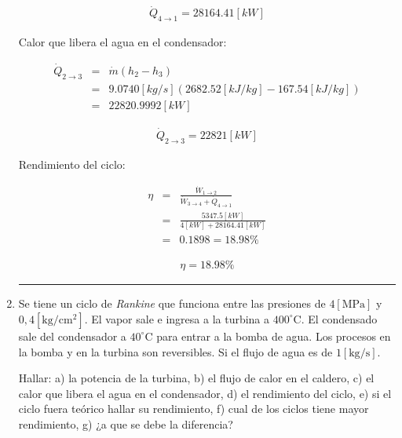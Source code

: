 \documentclass[letter,10pt]{article}
\begin{document}
\begin{enumerate}
\begin{equation*}
\boxed{
    \begin{array}{l}
        \dot{Q}_{4\rightarrow1} = 28164.41[kW]
    \end{array}
}
\end{equation*}

Calor que libera el agua en el condensador:

\begin{eqnarray*}
    \dot{Q}_{2\rightarrow3} &=& \dot{m}(h_2 - h_3) \\
                            &=& 9.0740[kg/s](2682.52[kJ/kg]-167.54[kJ/kg]) \\
                            &=& 22820.9992[kW]
\end{eqnarray*}

\begin{equation*}
\boxed{
    \begin{array}{l}
        \dot{Q}_{2\rightarrow3} = 22821[kW]
    \end{array}
}
\end{equation*}

Rendimiento del ciclo:

\begin{eqnarray*}
    \eta &=& \frac{\dot{W}_{1\rightarrow2}}
             {\dot{W}_{3\rightarrow4}+\dot{Q}_{4\rightarrow1}} \\
         &=& \frac{5347.5[kW]}{4[kW]+28164.41[kW]} \\
         &=& 0.1898 = 18.98\%
\end{eqnarray*}

\begin{equation*}
\boxed{
    \begin{array}{l}
        \eta = 18.98\%
    \end{array}
}
\end{equation*}

\noindent\rule{15.2cm}{0.4pt}

\item Se tiene un ciclo de \emph{Rankine} que funciona entre las presiones de
$4[\text{MPa}]$ y $0,4[\text{kg}/\text{cm}^2]$. El vapor sale e ingresa a la
turbina a $400^\circ\text{C}$. El condensado sale del condensador a
$40^\circ\text{C}$ para entrar a la bomba de agua. Los procesos en la bomba y en
la turbina son reversibles. Si el flujo de agua es de $1[\text{kg}/\text{s}]$.

Hallar: a) la potencia de la turbina, b) el flujo de calor en el caldero, c) el
calor que libera el agua en el condensador, d) el rendimiento del ciclo, e) si
el ciclo fuera teórico hallar su rendimiento, f) cual de los ciclos tiene mayor
rendimiento, g) ¿a que se debe la diferencia?


\end{enumerate}
\end{document}
